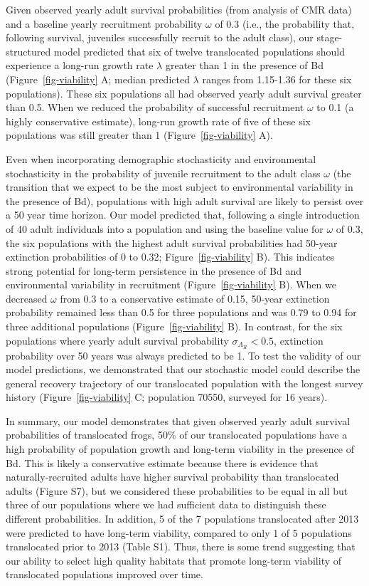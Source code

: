 \documentclass[9pt,twocolumn,twoside,lineno]{pnas-new}
\begin{document}
Given observed yearly adult survival probabilities (from analysis of CMR
data) and a baseline yearly recruitment probability \(\omega\) of 0.3
(i.e., the probability that, following survival, juveniles successfully
recruit to the adult class), our stage-structured model predicted that
six of twelve translocated populations should experience a long-run
growth rate \(\lambda\) greater than 1 in the presence of Bd
(Figure~\ref{fig-viability} A; median predicted \(\lambda\) ranges from
1.15-1.36 for these six populations). These six populations all had
observed yearly adult survival greater than 0.5. When we reduced the
probability of successful recruitment \(\omega\) to 0.1 (a highly
conservative estimate), long-run growth rate of five of these six
populations was still greater than 1 (Figure~\ref{fig-viability} A).

Even when incorporating demographic stochasticity and environmental
stochasticity in the probability of juvenile recruitment to the adult
class \(\omega\) (the transition that we expect to be the most subject
to environmental variability in the presence of Bd), populations with
high adult survival are likely to persist over a 50 year time horizon.
Our model predicted that, following a single introduction of 40 adult
individuals into a population and using the baseline value for
\(\omega\) of 0.3, the six populations with the highest adult survival
probabilities had 50-year extinction probabilities of 0 to 0.32;
Figure~\ref{fig-viability} B). This indicates strong potential for
long-term persistence in the presence of Bd and environmental
variability in recruitment (Figure~\ref{fig-viability} B). When we
decreased \(\omega\) from 0.3 to a conservative estimate of 0.15,
50-year extinction probability remained less than 0.5 for three
populations and was 0.79 to 0.94 for three additional populations
(Figure~\ref{fig-viability} B). In contrast, for the six populations
where yearly adult survival probability \(\sigma_{A_R} < 0.5\),
extinction probability over 50 years was always predicted to be 1. To
test the validity of our model predictions, we demonstrated that our
stochastic model could describe the general recovery trajectory of our
translocated population with the longest survey history
(Figure~\ref{fig-viability} C; population 70550, surveyed for 16 years).

In summary, our model demonstrates that given observed yearly adult
survival probabilities of translocated frogs, 50\% of our translocated
populations have a high probability of population growth and long-term
viability in the presence of Bd. This is likely a conservative estimate
because there is evidence that naturally-recruited adults have higher
survival probability than translocated adults
(Figure S7), but we considered these
probabilities to be equal in all but three of our populations where we
had sufficient data to distinguish these different probabilities. In
addition, 5 of the 7 populations translocated after 2013 were predicted
to have long-term viability, compared to only 1 of 5 populations
translocated prior to 2013 (Table S1). Thus,
there is some trend suggesting that our ability to select high quality
habitats that promote long-term viability of translocated populations
improved over time.
\end{document}
